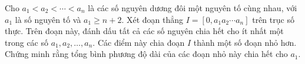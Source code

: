 \ifshowproblem
\begin{problem}\label{example:GBR-2015-TST-N3-P3}
    Cho \( a_1 < a_2 < \cdots < a_n \) là các số nguyên dương đôi một nguyên tố cùng nhau,
    với \( a_1 \) là số nguyên tố và \( a_1 \ge n + 2 \).  
    Xét đoạn thẳng \( I = [0, a_1 a_2 \cdots a_n] \) trên trục số thực.  
    Trên đoạn này, đánh dấu tất cả các số nguyên chia hết cho ít nhất một trong các số \( a_1, a_2, \ldots, a_n \).  
    Các điểm này chia đoạn \( I \) thành một số đoạn nhỏ hơn.  
    Chứng minh rằng tổng bình phương độ dài của các đoạn nhỏ này chia hết cho \( a_1 \).
\end{problem}
\fi

\fi